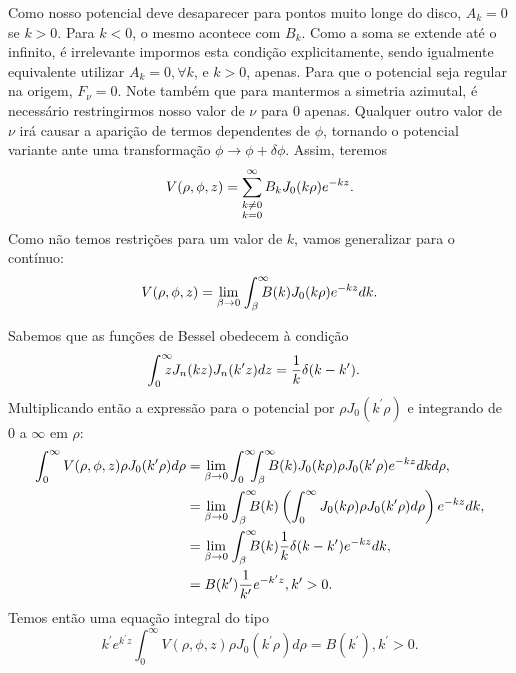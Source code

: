 \documentclass{article}
\begin{document}
Como nosso potencial deve desaparecer para pontos muito longe do disco, $A_k = 0$ se $k > 0$. Para $k < 0$, o mesmo acontece com $B_k$. Como a soma se extende até o
infinito, é irrelevante impormos esta condição explicitamente, sendo igualmente equivalente utilizar $A_k = 0, \forall k$, e $k>0$, apenas. Para que o potencial seja
regular na origem, $F_{\nu} = 0$. Note também que para mantermos a simetria azimutal, é necessário restringirmos nosso valor de $\nu$ para $0$ apenas. Qualquer outro
valor de $\nu$ irá causar a aparição de termos dependentes de $\phi$, tornando o potencial variante ante uma transformação $\phi \to \phi + \delta\phi$. Assim, teremos
\begin{equation}
 V(\rho,\phi,z) = \sum_{\mathclap{\substack{k \neq 0 \\ k = 0}}}^{\infty} B_k J_{0}(k\rho) e^{-kz} \mathrm{.}
\end{equation}
Como não temos restrições para um valor de $k$, vamos generalizar para o contínuo:
\begin{equation}
 V(\rho,\phi,z) = \lim_{\beta \to 0}\ \ \ \mathclap{\int_{\beta}^{\infty}}\ B(k) J_{0}(k\rho) e^{-kz} dk \mathrm{.}
\end{equation}

Sabemos que as funções de Bessel obedecem à condição
\begin{equation}
 \mathclap{\int_{0}^{\infty}}\ z J_{n}(kz)J_{n}(k^{\prime}z) dz = \frac{1}{k} \delta(k - k^{\prime})\mathrm{.}
\end{equation}
Multiplicando então a expressão para o potencial por $\rho J_{0}(k^{\prime}\rho)$ e integrando de $0$ a $\infty$ em $\rho$:
\begin{alignat}{1}
 \int_{0}^{\infty} V(\rho,\phi,z) \rho J_{0}(k^{\prime}\rho) d\rho &=
 \lim_{\beta \to 0} \int_{0}^{\infty} \ \mathclap{\int_{\beta}^{\infty}}\ B(k) J_{0}(k\rho) \rho J_{0}(k^{\prime}\rho) e^{-kz} dk d\rho \mathrm{,} \\
 &= \lim_{\beta \to 0} \ \ \ \mathclap{\int_{\beta}^{\infty}}\ B(k)
 \left( \int_{0}^{\infty} J_{0}(k\rho) \rho J_{0}(k^{\prime}\rho) d\rho \right) e^{-kz} dk \mathrm{,}\\
 &= \lim_{\beta \to 0} \ \ \ \mathclap{\int_{\beta}^{\infty}}\ B(k) \frac{1}{k}\delta(k - k^{\prime}) e^{-kz} dk \mathrm{,} \\
 &= B(k^{\prime}) \frac{1}{k^{\prime}} e^{-k^{\prime}z}, k^{\prime} > 0 \mathrm{.}
\end{alignat}
Temos então uma equação integral do tipo
\begin{equation}
 k^{\prime} e^{k^{\prime}z} \int_{0}^{\infty} V(\rho,\phi,z) \rho J_{0}(k^{\prime}\rho) d\rho = B(k^{\prime}), k^{\prime} > 0 \mathrm{.}
\end{equation}
\end{document}
